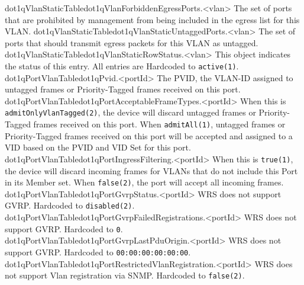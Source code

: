   {dot1qVlanStaticTable}{dot1qVlanForbiddenEgressPorts.<vlan>}{
	    The set of ports that are prohibited by management
	    from being included in the egress list for this VLAN.}
  {dot1qVlanStaticTable}{dot1qVlanStaticUntaggedPorts.<vlan>}{
	    The set of ports that should transmit egress packets
	    for this VLAN as untagged.}
  {dot1qVlanStaticTable}{dot1qVlanStaticRowStatus.<vlan>}{
	    This object indicates the status of this entry.
	    All entries are Hardcoded to \texttt{active(1)}.}
  {dot1qPortVlanTable}{dot1qPvid.<portId>}{
	    The PVID, the VLAN-ID assigned to untagged frames or
	    Priority-Tagged frames received on this port.}
  {dot1qPortVlanTable}{dot1qPortAcceptableFrameTypes.<portId>}{
	    When this is \texttt{admitOnlyVlanTagged(2)}, the device will
	    discard untagged frames or Priority-Tagged frames
	    received on this port.  When \texttt{admitAll(1)}, untagged
	    frames or Priority-Tagged frames received on this port
	    will be accepted and assigned to a VID based on the
	    PVID and VID Set for this port.}
  {dot1qPortVlanTable}{dot1qPortIngressFiltering.<portId>}{
	    When this is \texttt{true(1)}, the device will discard incoming
	    frames for VLANs that do not include this Port in its
	    Member set.  When \texttt{false(2)}, the port will accept all
	    incoming frames.}
  {dot1qPortVlanTable}{dot1qPortGvrpStatus.<portId>}{
	    WRS does not support GVRP. Hardcoded to \texttt{disabled(2)}.}
  {dot1qPortVlanTable}{dot1qPortGvrpFailedRegistrations.<portId>}{
	    WRS does not support GVRP. Hardcoded to \texttt{0}.}
  {dot1qPortVlanTable}{dot1qPortGvrpLastPduOrigin.<portId>}{
	    WRS does not support GVRP. Hardcoded to \texttt{00:00:00:00:00:00}.}
  {dot1qPortVlanTable}{dot1qPortRestrictedVlanRegistration.<portId>}{
	    WRS does not support Vlan registration via SNMP. Hardcoded to \texttt{false(2)}.}
